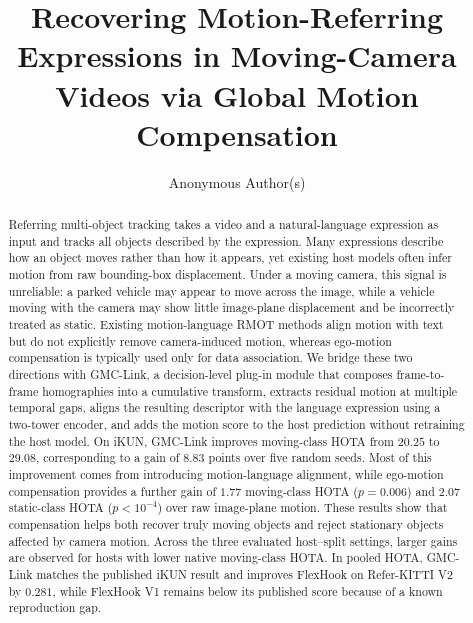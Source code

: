 \documentclass[sigconf,anonymous,nonacm]{acmart}
\begin{document}
\title{Recovering Motion-Referring Expressions in Moving-Camera Videos via Global Motion Compensation}

\author{Anonymous Author(s)}

\begin{abstract}
Referring multi-object tracking takes a video and a natural-language expression as input and tracks all objects described by the expression. Many expressions describe how an object moves rather than how it appears, yet existing host models often infer motion from raw bounding-box displacement. Under a moving camera, this signal is unreliable: a parked vehicle may appear to move across the image, while a vehicle moving with the camera may show little image-plane displacement and be incorrectly treated as static. Existing motion-language RMOT methods align motion with text but do not explicitly remove camera-induced motion, whereas ego-motion compensation is typically used only for data association. We bridge these two directions with GMC-Link, a decision-level plug-in module that composes frame-to-frame homographies into a cumulative transform, extracts residual motion at multiple temporal gaps, aligns the resulting descriptor with the language expression using a two-tower encoder, and adds the motion score to the host prediction without retraining the host model. On iKUN, GMC-Link improves moving-class HOTA from $20.25$ to $29.08$, corresponding to a gain of $8.83$ points over five random seeds. Most of this improvement comes from introducing motion-language alignment, while ego-motion compensation provides a further gain of $1.77$ moving-class HOTA ($p{=}0.006$) and $2.07$ static-class HOTA ($p{<}10^{-4}$) over raw image-plane motion. These results show that compensation helps both recover truly moving objects and reject stationary objects affected by camera motion. Across the three evaluated host--split settings, larger gains are observed for hosts with lower native moving-class HOTA. In pooled HOTA, GMC-Link matches the published iKUN result and improves FlexHook on Refer-KITTI V2 by $0.281$, while FlexHook V1 remains below its published score because of a known reproduction gap.
\end{abstract}


\maketitle
\thispagestyle{empty}
\pagestyle{empty}
\end{document}

